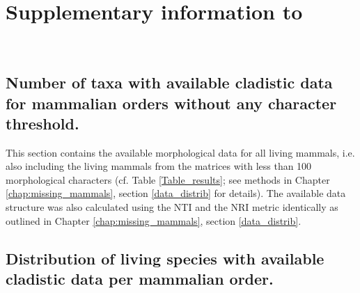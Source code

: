 %
%

\chapter{Supplementary information to }
\label{chap:Appendix_missing_mammals}

\bigskip
\medskip
\begin{center}

 \\
\bigskip
\end{center}


\section{Number of taxa with available cladistic data for mammalian orders without any character threshold.}
This section contains the available morphological data for all living mammals, i.e. also including the living mammals from the matrices with less than 100 morphological characters (cf. Table \ref{Table_results}; see methods in Chapter \ref{chap:missing_mammals}, section \ref{data_distrib} for details).
The available data structure was also calculated using the NTI and the NRI metric identically as outlined in Chapter \ref{chap:missing_mammals}, section \ref{data_distrib}.



\section{Distribution of living species with available cladistic data per mammalian order.}

